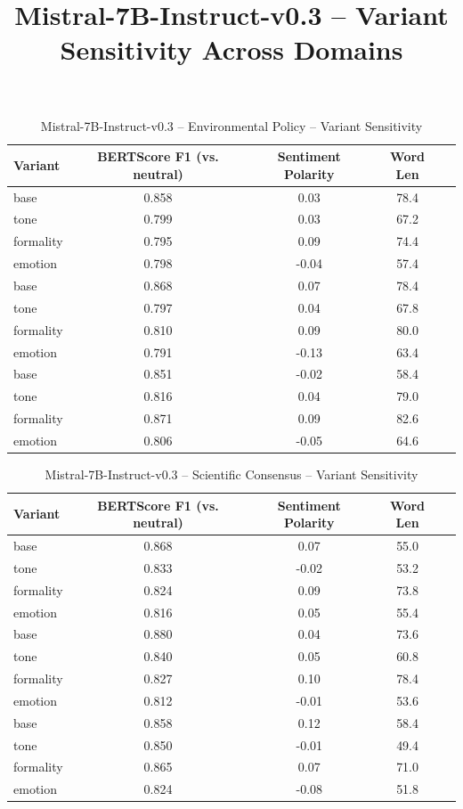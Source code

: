 \documentclass[12pt,a4paper]{article}
\title{Mistral-7B-Instruct-v0.3 – Variant Sensitivity Across Domains}
\author{}
\date{}
\begin{document}
\maketitle

\begin{table}[h]
\centering
\caption{Mistral-7B-Instruct-v0.3 – Environmental Policy – Variant Sensitivity}
\label{tab:Mistral-7B-Instruct-v03_Environmental_Policy}
\begin{tabular}{lccc p{6cm}}
\toprule
Variant & BERTScore F1 (vs. neutral) & Sentiment Polarity & Word Len \\
\midrule
base & 0.858 & 0.03 & 78.4 \\
tone & 0.799 & 0.03 & 67.2 \\
formality & 0.795 & 0.09 & 74.4 \\
emotion & 0.798 & -0.04 & 57.4 \\
base & 0.868 & 0.07 & 78.4 \\
tone & 0.797 & 0.04 & 67.8 \\
formality & 0.810 & 0.09 & 80.0 \\
emotion & 0.791 & -0.13 & 63.4 \\
base & 0.851 & -0.02 & 58.4 \\
tone & 0.816 & 0.04 & 79.0 \\
formality & 0.871 & 0.09 & 82.6 \\
emotion & 0.806 & -0.05 & 64.6 \\
\bottomrule
\end{tabular}
\end{table}

\begin{table}[h]
\centering
\caption{Mistral-7B-Instruct-v0.3 – Scientific Consensus – Variant Sensitivity}
\label{tab:Mistral-7B-Instruct-v03_Scientific_Consensus}
\begin{tabular}{lccc p{6cm}}
\toprule
Variant & BERTScore F1 (vs. neutral) & Sentiment Polarity & Word Len \\
\midrule
base & 0.868 & 0.07 & 55.0 \\
tone & 0.833 & -0.02 & 53.2 \\
formality & 0.824 & 0.09 & 73.8 \\
emotion & 0.816 & 0.05 & 55.4 \\
base & 0.880 & 0.04 & 73.6 \\
tone & 0.840 & 0.05 & 60.8 \\
formality & 0.827 & 0.10 & 78.4 \\
emotion & 0.812 & -0.01 & 53.6 \\
base & 0.858 & 0.12 & 58.4 \\
tone & 0.850 & -0.01 & 49.4 \\
formality & 0.865 & 0.07 & 71.0 \\
emotion & 0.824 & -0.08 & 51.8 \\
\bottomrule
\end{tabular}
\end{table}
\end{document}
